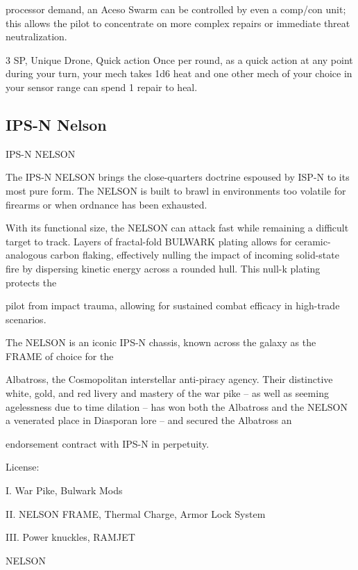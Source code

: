 processor demand, an Aceso Swarm can be controlled by even a comp/con unit; this allows the pilot to  
concentrate on more complex repairs or immediate threat neutralization.    

3 SP, Unique  
Drone, Quick action  
Once per round, as a quick action at any point during your turn, your mech takes 1d6 heat and  
one other mech of your choice in your sensor range can spend 1 repair to heal.   

                                                                                                                      
\subsection{IPS-N Nelson}

                                              IPS-N NELSON  

The IPS-N NELSON brings the close-quarters doctrine espoused by ISP-N to its most pure form. The  
NELSON is built to brawl in environments too volatile for firearms or when ordnance has been exhausted.  

With its functional size, the NELSON can attack fast while remaining a difficult target to track. Layers of  
fractal-fold BULWARK plating allows for ceramic-analogous carbon flaking, effectively nulling the impact of  
incoming solid-state fire by dispersing kinetic energy across a rounded hull. This null-k plating protects the  

pilot from impact trauma, allowing for sustained combat efficacy in high-trade scenarios.   

The NELSON is an iconic IPS-N chassis, known across the galaxy as the FRAME of choice for the  

Albatross, the Cosmopolitan interstellar anti-piracy agency. Their distinctive white, gold, and red livery and  
mastery of the war pike -- as well as seeming agelessness due to time dilation -- has won both the  
Albatross and the NELSON a venerated place in Diasporan lore -- and secured the Albatross an  

endorsement contract with IPS-N in perpetuity.   

                                                     License:
 
I. War Pike, Bulwark Mods
 
II. NELSON FRAME, Thermal Charge, Armor Lock System
 
III. Power knuckles, RAMJET
 

                                                    NELSON 

